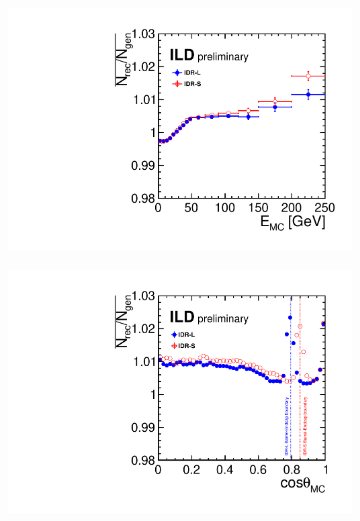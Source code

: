 \begin{figure}[htbp]
\begin{subfigure}{0.49\hsize} 
\includegraphics[width=\textwidth]{Performance/fig/NrecNgenE_photon_IDR_wo_cosTheta08.pdf}
 \caption{ \label{fig:WIMP:Ngamma:Egood}}
 \end{subfigure}
\begin{subfigure}{0.49\hsize} 
\includegraphics[width=\textwidth]{Performance/fig/NrecNgenCosTheta_allpfo_IDR.pdf}
 \caption{  \label{fig:WIMP:NPFO:theta}}
 \end{subfigure}

\end{figure}
